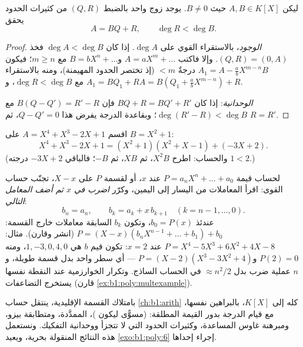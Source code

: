 \begin{theorem}\label{thm:b1:poly:division}
ليكن $A, B \in K[X]$ حيث $B \neq 0$. يوجد زوج واحد بالضبط $(Q,
R)$ من كثيرات الحدود يحقق
\[
A = BQ + R, \qquad \deg R < \deg B .
\]
\end{theorem}

\begin{proof}
\emph{الوجود}، بالاستقراء القوي على $\deg A$. إذا كان $\deg A < \deg
B$ فخذ $(Q, R) = (0, A)$. وإلا فاكتب $A = a X^m + \dots$ و$B =
b X^n + \dots$ مع $m \geq n$؛ فيكون  $A_1 = A - \frac ab
X^{m-n} B$ درجةٌ $< m$ (إذ تختصر الحدود المهيمنة)، ومنه
بالاستقراء $A_1 = BQ_1 + R$ مع $\deg R < \deg B$، و$A = B(Q_1 +
\frac ab X^{m-n}) + R$.

\emph{الوحدانية}: إذا كان $BQ + R = BQ' + R'$ فإن $B(Q - Q') = R' - R$
مع $\deg(R' - R) < \deg B$؛ وبقاعدة الدرجة يفرض هذا $Q - Q'
= 0$، ثم $R = R'$.
\end{proof}

\begin{example}\label{ex:b1:poly:division}
اقسم $A = X^4 + X^3 - 2X + 1$ على $B = X^2 + 1$:
\[
X^4 + X^3 - 2X + 1 = (X^2 + 1)(X^2 + X - 1) + (-3X + 2).
\]
(والحساب: اطرح $X^2 B$، ثم $X B$، ثم $-B$؛ فالباقي
$-3X + 2$ درجته $1 < 2$.)
\end{example}

\begin{method}\label{met:b1:poly:horner}
لحساب قيمة $P = a_nX^n + \dots + a_0$ عند $x$، أو لقسمة $P$ على
$X - x$، تجنّب حساب القوى: اقرأ المعاملات من اليسار إلى
اليمين، وكرّر \emph{اضرب في $x$ ثم أضف المعامل
التالي}:
\[
b_n = a_n, \qquad b_{k} = a_{k} + x\,b_{k+1}
\quad (k = n-1, \dots, 0) .
\]
عندئذ $b_0 = P(x)$، وتكون $b_k$ السابقة معاملات
خارج القسمة: $P = (X - x)(b_nX^{n-1} + \dots + b_1) + b_0$
(انشر وقارن). مثال: $P = X^4 - 5X^3 + 6X^2 + 4X - 8$
عند $x = 2$: تكون قيم $b$ هي $1, -3, 0, 4, 0$، ومنه $P(2) = 0$ و$P
= (X-2)(X^3 - 3X^2 + 4)$ --- أي سطر واحد بدل قسمة
طويلة، و $n$ عملية ضرب بدل $\approx n^2/2$
في الحساب الساذج. وتكرار الخوارزمية عند النقطة نفسها
يستخرج التضاعفات (قارن
\cref{ex:b1:poly:multexample}).
\end{method}

\begin{remark}
بامتلاك القسمة الإقليدية، ينتقل حساب
\cref{ch:b1:arith} كله إلى $K[X]$، بالبراهين نفسها، مع قيام الدرجة
بدور القيمة المطلقة:  (مسوًّى ليكون )،
 الممدَّدة، ومتطابقة بيزو، ومبرهنة غاوس المساعدة،
وكثيرات الحدود التي لا تتجزأ ووحدانية التفكيك. ونستعمل هذه
النتائج المنقولة بحرية، ويعيد \cref{exo:b1:poly:6} إجراء إحداها.
\end{remark}

